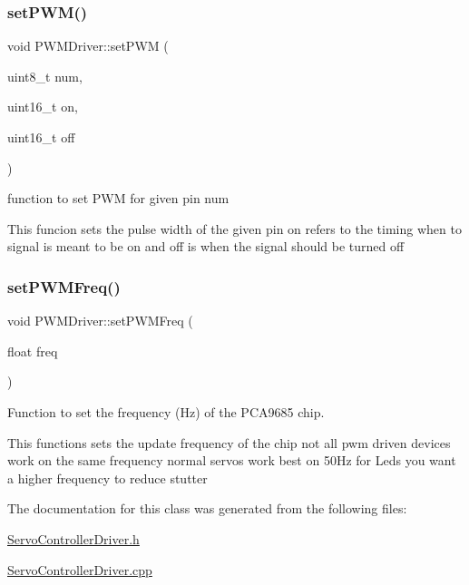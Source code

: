 \subsubsection{\texorpdfstring{set\+P\+W\+M()}{setPWM()}}
{\footnotesize\ttfamily void P\+W\+M\+Driver\+::set\+P\+WM (\begin{DoxyParamCaption}\item[{uint8\+\_\+t}]{num,  }\item[{uint16\+\_\+t}]{on,  }\item[{uint16\+\_\+t}]{off }\end{DoxyParamCaption})}



function to set P\+WM for given pin num 

This funcion sets the pulse width of the given pin on refers to the timing when to signal is meant to be on and off is when the signal should be turned off \mbox{\label{classPWMDriver_ae52eb9cef15ce7bec9acef557e08f47e}} 
\subsubsection{\texorpdfstring{set\+P\+W\+M\+Freq()}{setPWMFreq()}}
{\footnotesize\ttfamily void P\+W\+M\+Driver\+::set\+P\+W\+M\+Freq (\begin{DoxyParamCaption}\item[{float}]{freq }\end{DoxyParamCaption})}



Function to set the frequency (Hz) of the P\+C\+A9685 chip. 

This functions sets the update frequency of the chip not all pwm driven devices work on the same frequency normal servos work best on 50\+Hz for Leds you want a higher frequency to reduce stutter 

The documentation for this class was generated from the following files\+:\begin{DoxyCompactItemize}
\item 
\hyperlink{ServoControllerDriver_8h}{Servo\+Controller\+Driver.\+h}\item 
\hyperlink{ServoControllerDriver_8cpp}{Servo\+Controller\+Driver.\+cpp}\end{DoxyCompactItemize}
